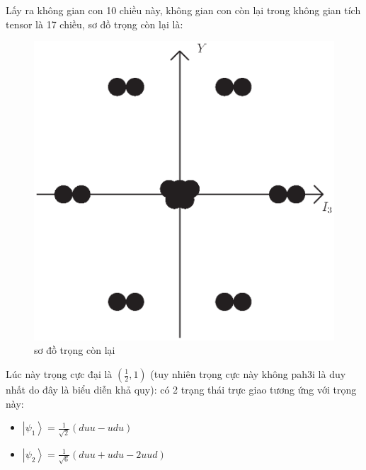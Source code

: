 \documentclass{report}
\begin{document}
Lấy ra không gian con 10 chiều này, không gian con còn lại trong không gian tích tensor là 17 chiều, sơ đồ trọng còn lại là:

	\begin{figure}[!htb]
		\centering
		\includegraphics[scale=0.5]{diagram7.eps}
		\caption{sơ đồ trọng còn lại}
	\end{figure}	

Lúc này trọng cực đại là \( \left( \frac{1}{2}, 1 \right) \) (tuy nhiên trọng cực này không pah3i là duy nhất do đây là biểu diễn khả quy): có 2 trạng thái trực giao tương ứng với trọng này:

	\begin{itemize}
		\item \( \left| \psi_{1} \right\rangle = \frac{1}{\sqrt{2}} \left( duu - udu \right) \)
		\item \( \left| \psi_{2} \right\rangle = \frac{1}{\sqrt{6}} \left( duu + udu - 2 uud \right) \)
	\end{itemize}
	
\end{document}
